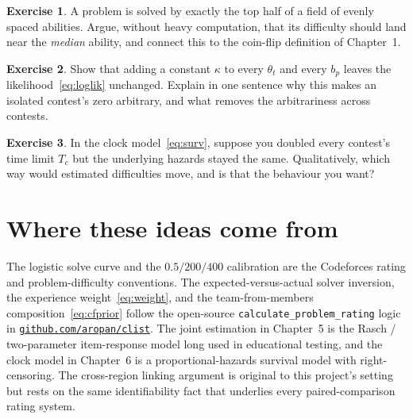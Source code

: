 \documentclass[11pt]{report}
\theoremstyle{definition}
\newtheorem{exercise}{Exercise}[chapter]
\numberwithin{equation}{chapter}
\begin{document}
\begin{exercise}
A problem is solved by exactly the top half of a field of evenly spaced abilities.
Argue, without heavy computation, that its difficulty should land near the
\emph{median} ability, and connect this to the coin-flip definition of
Chapter~1.
\end{exercise}

\begin{exercise}
Show that adding a constant $\kappa$ to every $\theta_t$ and every $b_p$ leaves
the likelihood~\eqref{eq:loglik} unchanged. Explain in one sentence why this makes
an isolated contest's zero arbitrary, and what removes the arbitrariness across
contests.
\end{exercise}

\begin{exercise}
In the clock model~\eqref{eq:surv}, suppose you doubled every contest's time limit
$T_c$ but the underlying hazards stayed the same. Qualitatively, which way would
estimated difficulties move, and is that the behaviour you want?
\end{exercise}

\chapter*{Where these ideas come from}

The logistic solve curve and the $0.5/200/400$ calibration are the Codeforces
rating and problem-difficulty conventions. The expected-versus-actual solver
inversion, the experience weight~\eqref{eq:weight}, and the team-from-members
composition~\eqref{eq:cfprior} follow the open-source
\texttt{calculate\_problem\_rating} logic in
\href{https://github.com/aropan/clist}{\texttt{github.com/aropan/clist}}. The
joint estimation in Chapter~5 is the Rasch / two-parameter item-response model
long used in educational testing, and the clock model in Chapter~6 is a
proportional-hazards survival model with right-censoring. The cross-region linking
argument is original to this project's setting but rests on the same
identifiability fact that underlies every paired-comparison rating system.
\end{document}
